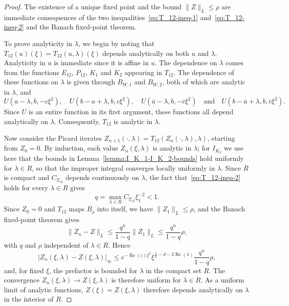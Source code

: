 \documentclass[11pt]{article}
\DeclareMathOperator{\real}{Re}
\newcommand{\conj}[1]{\overline{#1}}
\begin{document}
\begin{proof}
  The existence of a unique fixed point and the bound
  \(\|Z\|_{L} \leq \rho\) are immediate consequences of the two
  inequalities~\eqref{eq:T_12-ineq-1} and~\eqref{eq:T_12-ineq-2} and
  the Banach fixed-point theorem.

  To prove analyticity in \(\lambda\), we begin by noting that
  \(T_{12}(u)(\xi) = T_{12}(u, \lambda)(\xi)\) depends analytically on
  both \(u\) and \(\lambda\). Analyticity in \(u\) is immediate since
  it is affine in \(u\). The dependence on \(\lambda\) comes from
  the functions \(E_{12}\), \(P_{12}\), \(K_{1}\) and \(K_{2}\)
  appearing in \(T_{12}\). The dependence of these functions on
  \(\lambda\) is given through \(B_{W,1}\) and \(B_{W,2}\), both of
  which are analytic in \(\lambda\), and
  \begin{equation*}
    U\left(a - \lambda, b, -c\xi^{2}\right),\quad
    U\left(b - a + \lambda, b, c\xi^{2}\right),\quad
    U\left(\conj{a} - \lambda, b, -\conj{c}\xi^{2}\right) \quad\text{and}\quad
    U\left(b - \conj{a} + \lambda, b, \conj{c}\xi^{2}\right).
  \end{equation*}
  Since \(U\) is an entire function in its first argument, these
  functions all depend analytically on \(\lambda\). Consequently,
  \(T_{12}\) is analytic in \(\lambda\).

  Now consider the Picard iterates
  \(Z_{n + 1}(\cdot, \lambda) = T_{12}(Z_{n}(\cdot, \lambda), \lambda)\),
  starting from \(Z_{0} = 0\). By induction, each value
  \(Z_{n}(\xi, \lambda)\) is analytic in \(\lambda\); for
  \(I_{K_{2}}\) we use here that the bounds in
  Lemma~\ref{lemma:I_K_1-I_K_2-bounds} hold uniformly for
  \(\lambda \in R\), so that the improper integral converges locally
  uniformly in \(\lambda\). Since \(R\) is compact and \(C_{T_{12}}\)
  depends continuously on \(\lambda\), the fact
  that~\eqref{eq:T_12-ineq-2} holds for every \(\lambda \in R\) gives
  \begin{equation*}
    q = \max_{\lambda \in R}C_{T_{12}}\xi_{1}^{-2} < 1.
  \end{equation*}
  Since \(Z_{0} = 0\) and \(T_{12}\) maps \(B_{\rho}\) into itself, we
  have \(\|Z_{1}\|_{L} \leq \rho\), and the Banach fixed-point theorem
  gives
  \begin{equation*}
    \|Z_{n} - Z\|_{L} \leq \frac{q^{n}}{1 - q}\|Z_{1}\|_{L}
    \leq \frac{q^{n}}{1 - q}\rho,
  \end{equation*}
  with \(q\) and \(\rho\) independent of \(\lambda \in R\). Hence
  \begin{equation*}
    |Z_{n}(\xi, \lambda) - Z(\xi, \lambda)|_{\infty}
    \leq e^{-\real(c)\xi^{2}}\xi^{\frac{1}{\sigma} - d - 2\real(\lambda)}\frac{q^{n}}{1 - q}\rho,
  \end{equation*}
  and, for fixed \(\xi\), the prefactor is bounded for \(\lambda\) in
  the compact set \(R\). The convergence
  \(Z_{n}(\xi, \lambda) \to Z(\xi, \lambda)\) is therefore uniform for
  \(\lambda \in R\). As a uniform limit of analytic functions,
  \(Z(\xi) = Z(\xi, \lambda)\) therefore depends analytically on
  \(\lambda\) in the interior of \(R\).


\end{proof}
\end{document}
